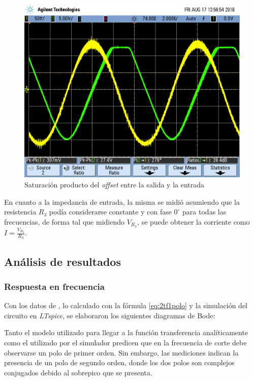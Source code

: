 \documentclass[../../main.tex]{subfiles}
\begin{document}
\begin{figure}[h]
	\centering
	\includegraphics[scale=0.4]{fotos/tc_tp2_ej2_saturacion.png}
	\caption{Saturaci\'on producto del \textit{offset} entre la salida y la entrada}
\end{figure}

En cuanto a la impedancia de entrada, la misma se midi\'o asumiendo que la resistencia $R_3$ pod\'ia considerarse constante y con fase $0^\circ$ para todas las frecuencias, de forma tal que midiendo $V_{R_3}$, se puede obtener la corriente como $I = \frac{V_{R_3}}{R_3}$.


\subsection{An\'alisis de resultados}

\subsubsection{Respuesta en frecuencia}

Con los datos de , lo calculado con la f\'ormula \ref{eq:2tf1polo} y la simulaci\'on del circuito en \textit{LTspice}, se elaboraron los siguientes diagramas de Bode:
 

Tanto el modelo utilizado para llegar a la funci\'on transferencia anal\'iticamente como el utilizado por el simulador predicen que en la frecuencia de corte debe observarse un polo de primer orden. Sin embargo, las mediciones indican la presencia de un polo de segundo orden, donde los dos polos son complejos conjugados debido al sobrepico que se presenta. \par
\end{document}
